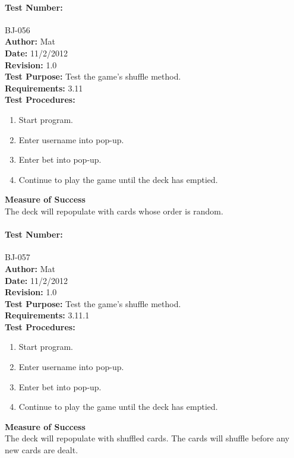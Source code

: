 \documentclass{article}
\begin{document}
\paragraph{Test Number:} BJ-056\\
\textbf{Author:} Mat\\
\textbf{Date:} 11/2/2012\\
\textbf{Revision:} 1.0\\
\textbf{Test Purpose:} Test the game's shuffle method.\\
\textbf{Requirements:} 3.11 \\
\textbf{Test Procedures:} 
\begin{enumerate}
\item Start program.
\item Enter username into pop-up.
\item Enter bet into pop-up.
\item Continue to play the game until the deck has emptied.
\end{enumerate}
\textbf{Measure of Success}\\The deck will repopulate with cards whose order is random.
\paragraph{Test Number:} BJ-057\\
\textbf{Author:} Mat\\
\textbf{Date:} 11/2/2012\\
\textbf{Revision:} 1.0\\
\textbf{Test Purpose:} Test the game's shuffle method.\\
\textbf{Requirements:} 3.11.1 \\
\textbf{Test Procedures:} 
\begin{enumerate}
\item Start program.
\item Enter username into pop-up.
\item Enter bet into pop-up.
\item Continue to play the game until the deck has emptied.
\end{enumerate}
\textbf{Measure of Success}\\The deck will repopulate with shuffled cards. The cards will shuffle before any new cards are dealt.
\end{document}
